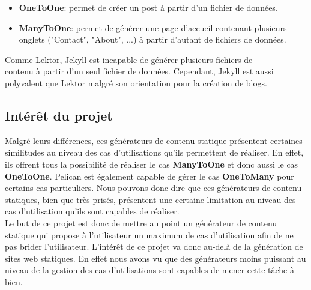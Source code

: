 	\begin{itemize}
		\item \textbf{OneToOne}: permet de créer un post à partir d'un fichier de données.
		\item \textbf{ManyToOne}: permet de générer une page d'accueil contenant plusieurs onglets ("Contact", "About", ...) à partir d'autant de fichiers de données. 
	\end{itemize}
	
	Comme Lektor, Jekyll est incapable de générer plusieurs fichiers de \\contenu à partir d'un seul fichier de données. Cependant, Jekyll est aussi polyvalent que Lektor malgré son orientation pour la création de blogs.
	
	\subsection*{Intérêt du projet}
	
	Malgré leurs différences, ces générateurs de contenu statique présentent certaines similitudes au niveau des cas d'utilisations qu'ils permettent de réaliser. En effet, ils offrent tous la possibilité de réaliser le cas \textbf{ManyToOne} et donc aussi le cas \textbf{OneToOne}. Pelican est également capable de gérer le cas \textbf{OneToMany} pour certains cas particuliers. Nous pouvons donc dire que ces générateurs de contenu statiques, bien que très prisés, présentent une certaine limitation au niveau des cas d'utilisation qu'ils sont capables de réaliser.\\
	
	Le but de ce projet est donc de mettre au point un générateur de contenu statique qui propose à l'utilisateur un maximum de cas d'utilisation afin de ne pas brider l'utilisateur. L'intérêt de ce projet va donc au-delà de la génération de sites web statiques. En effet nous avons vu que des générateurs moins puissant au niveau de la gestion des cas d'utilisations sont capables de mener cette tâche à bien.